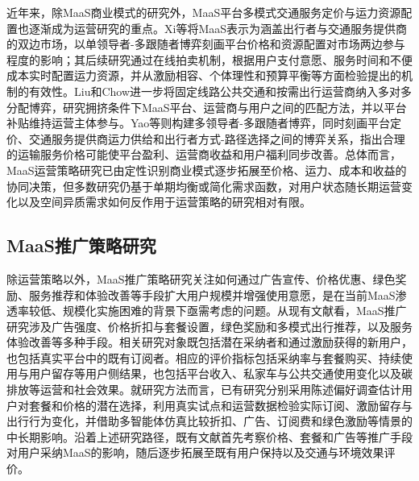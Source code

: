 近年来，除MaaS商业模式的研究外，MaaS平台多模式交通服务定价与运力资源配置也逐渐成为运营研究的重点。Xi等\citep{xiSingleleaderMultifollowerGames2022}将MaaS表示为涵盖出行者与交通服务提供商的双边市场，以单领导者-多跟随者博弈刻画平台价格和资源配置对市场两边参与程度的影响；其后续研究通过在线拍卖机制，根据用户支付意愿、服务时间和不便成本实时配置运力资源，并从激励相容、个体理性和预算平衡等方面检验提出的机制的有效性\citep{xiIncentivecompatibleMechanismsOnline2023}。Liu和Chow\citep{liuOndemandMobilityasaServicePlatform2024}进一步将固定线路公共交通和按需出行运营商纳入多对多分配博弈，研究拥挤条件下MaaS平台、运营商与用户之间的匹配方法，并以平台补贴维持运营主体参与。Yao等\citep{yaoMobilityasaserviceMaaSSystem2026}则构建多领导者-多跟随者博弈，同时刻画平台定价、交通服务提供商运力供给和出行者方式-路径选择之间的博弈关系，指出合理的运输服务价格可能使平台盈利、运营商收益和用户福利同步改善。总体而言，MaaS运营策略研究已由定性识别商业模式逐步拓展至价格、运力、成本和收益的协同决策，但多数研究仍基于单期均衡或简化需求函数，对用户状态随长期运营变化以及空间异质需求如何反作用于运营策略的研究相对有限。

\subsection{MaaS推广策略研究}\label{subsec.review.promo.promotion}

除运营策略以外，MaaS推广策略研究关注如何通过广告宣传、价格优惠、绿色奖励、服务推荐和体验改善等手段扩大用户规模并增强使用意愿，是在当前MaaS渗透率较低、规模化实施困难的背景下亟需考虑的问题。从现有文献看，MaaS推广研究涉及广告强度、价格折扣与套餐设置\citep{tangExploringPotentialAdoption2025}，绿色奖励和多模式出行推荐\citep{zhangPromotingLowCarbon2025}，以及服务体验改善\citep{chenDeeperLookEffects2026}等多种手段。相关研究对象既包括潜在采纳者和通过激励获得的新用户，也包括真实平台中的既有订阅者\citep{cisternaAssessingWillingnessPay2024,yuTransitioningIncentivebasedUser2025,chenInvestigatingCustomersTypical2025}。相应的评价指标包括采纳率与套餐购买、持续使用与用户留存等用户侧结果，也包括平台收入、私家车与公共交通使用变化以及碳排放等运营和社会效果\citep{hoDriversParticipantsChoices2021,yuTransitioningIncentivebasedUser2025,aliMonitoringEvaluationTravel2025,zhangPromotingLowCarbon2025}。就研究方法而言，已有研究分别采用陈述偏好调查估计用户对套餐和价格的潜在选择\citep{hoPotentialUptakeWillingnesstopay2018}，利用真实试点和运营数据检验实际订阅、激励留存与出行行为变化\citep{hoDriversParticipantsChoices2021,yuTransitioningIncentivebasedUser2025,aliMonitoringEvaluationTravel2025}，并借助多智能体仿真比较折扣、广告、订阅费和绿色激励等情景的中长期影响\citep{tangExploringPotentialAdoption2025,cisternaAssessingWillingnessPay2024,zhangPromotingLowCarbon2025}。沿着上述研究路径，既有文献首先考察价格、套餐和广告等推广手段对用户采纳MaaS的影响，随后逐步拓展至既有用户保持以及交通与环境效果评价。

